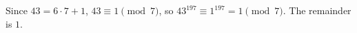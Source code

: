 Since \(43=6\cdot7+1\), \(43\equiv1\pmod7\), so \(43^{197}\equiv1^{197}=1\pmod 7\). The remainder is \(\boxed{1}\).
